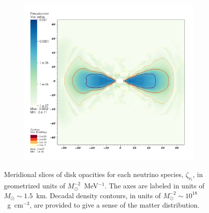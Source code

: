 \begin{figure}
\begin{subfigure}{.31\textwidth}
  \end{subfigure}
  \begin{subfigure}{.31\textwidth}
    \centering
    \includegraphics[width=1\linewidth]{Figures/zetax_meridional}
  \end{subfigure}
  \caption[Disk opacities]{
    Meridional slices of disk opacities for each neutrino species,
    $\zeta_{\nu_i}$, in geometrized units of $M_\odot^{-2}$~MeV$^{-1}$.
    The axes are labeled in units of $M_\odot\sim1.5$~km.
    Decadal density contours, in units of $M_\odot^{-2}\sim10^{18}$~g~cm$^{-3}$,
    are provided to give a sense of the matter distribution.
  }
  \label{fig:zeta_meridional}
\end{figure}

